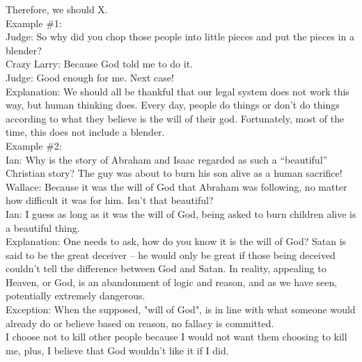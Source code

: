 \documentclass[a4paper,12pt,single,pdftex]{scrartcl}
\begin{document}
    
      Therefore, we should X.
    \\

    
      Example \#1:
    \\

    
      Judge: So why did you chop those people into little pieces and put the pieces in a blender?
    \\

    
      Crazy Larry: Because God told me to do it.
    \\

    
      Judge: Good enough for me.  Next case!
    \\

    
      Explanation: We should all be thankful that our legal system does not work this way, but human thinking does.  Every day, people do things or don’t do things according to what they believe is the will of their god.  Fortunately, most of the time, this does not include a blender.
    \\

    
      Example \#2:
    \\

    
      Ian: Why is the story of Abraham and Isaac regarded as such a “beautiful” Christian story?  The guy was about to burn his son alive as a human sacrifice!
    \\

    
      Wallace: Because it was the will of God that Abraham was following, no matter how difficult it was for him.  Isn’t that beautiful?
    \\

    
      Ian: I guess as long as it was the will of God, being asked to burn children alive is a beautiful thing.
    \\

    
      Explanation: One needs to ask, how do you know it is the will of God?  Satan is said to be the great deceiver -- he would only be great if those being deceived couldn’t tell the difference between God and Satan.  In reality, appealing to Heaven, or God, is an abandonment of logic and reason, and as we have seen, potentially extremely dangerous.
    \\

    
      Exception: When the supposed, "will of God", is in line with what someone would already do or believe based on reason, no fallacy is committed.
    \\

    
      I choose not to kill other people because I would not want them choosing to kill me, plus, I believe that God wouldn’t like it if I did.
    \\
\end{document}
